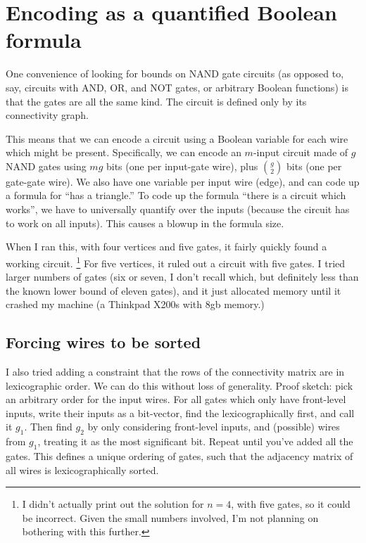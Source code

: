 \documentclass[12pt]{article}
\begin{document}
\section{Encoding as a quantified Boolean formula}

One convenience of looking for bounds on NAND gate circuits
(as opposed to, say, circuits with AND, OR, and NOT gates,
or arbitrary Boolean functions) is that the gates are all
the same kind. The circuit is defined only by its
connectivity graph.

This means that we can encode a circuit
using a Boolean variable for each wire which might be
present. Specifically, we can encode an $m$-input circuit
made of $g$ NAND gates using $mg$ bits (one per input-gate
wire), plus $g \choose 2$ bits (one per gate-gate wire).
We also have one variable per input wire (edge), and can code up
a formula for ``has a triangle.''
To code up the formula ``there is a circuit which works'', we
have to universally quantify over the inputs (because the
circuit has to work on all inputs). This causes a
blowup in the formula size.

When I ran this, with four vertices and five gates, it
fairly quickly found a working circuit. 
\footnote{I didn't actually print out the solution for $n=4$, with
five gates, so it could be incorrect. Given the small numbers
involved, I'm not planning on bothering with this further.}
For five vertices, it ruled out a circuit with five gates.
I tried larger numbers of gates (six or seven, I don't recall
which, but definitely less than the known lower bound of eleven
gates), and it just allocated memory until it crashed
my machine (a Thinkpad X200s with 8gb memory.)

\subsection{Forcing wires to be sorted}

I also tried adding a constraint that the rows of
the connectivity matrix are in lexicographic order.
We can do this without loss of generality. Proof sketch:
pick an arbitrary order for the input wires. For all gates
which only have front-level inputs, write their inputs as
a bit-vector, find the lexicographically first, and call it
$g_1$. Then find $g_2$ by only considering front-level inputs,
and (possible) wires from $g_1$, treating it as the most significant bit.
Repeat until you've added all the gates.
This defines a unique ordering of gates, such that the adjacency
matrix of all wires is lexicographically sorted.
\end{document}
